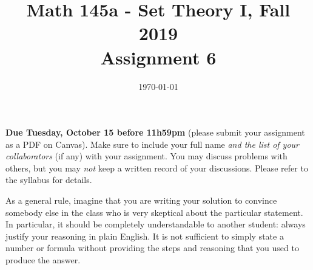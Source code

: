 \documentclass{amsart}
\title[Math 145a, Fall 2019: assignment 6]{Math 145a - Set Theory I, Fall 2019 \\ Assignment 6}
\date{\today}
\theoremstyle{definition}
\begin{document}

\vspace*{-10em}

\maketitle

\textbf{Due Tuesday, October 15 before 11h59pm} (please submit your assignment as a PDF on Canvas). Make sure to include your full name \emph{and the list of your collaborators} (if any) with your assignment. You may discuss problems with others, but you may \emph{not} keep a written record of your discussions. Please refer to the syllabus for details.

As a general rule, imagine that you are writing your solution to convince somebody else in the class who is very skeptical about the particular statement. In particular, it should be completely understandable to another student: always justify your reasoning in plain English. It is not sufficient to simply state a number or formula without providing the steps and reasoning that you used to produce the answer.
\end{document}
